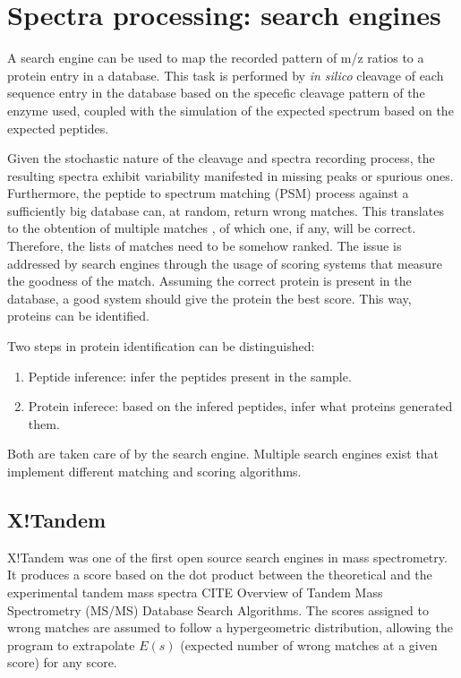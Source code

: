 \documentclass[11pt, a4paper]{report}
\begin{document}
\section{Spectra processing: search engines}
\label{sec:search_engines}

A search engine can be used to map the recorded pattern of m/z ratios to a protein entry in a database. This task is performed by \textit{in silico} cleavage of each sequence entry in the database based on the specefic cleavage pattern of the enzyme used, coupled with the simulation of the expected spectrum based on the expected peptides.

Given the stochastic nature of the cleavage and spectra recording process, the resulting spectra exhibit variability manifested in missing peaks or spurious ones. Furthermore, the peptide to spectrum matching (PSM) process against a sufficiently big database can, at random, return wrong matches. This translates to the obtention of multiple matches , of which one, if any, will be correct. Therefore, the lists of matches need to be somehow ranked. The issue is addressed by search engines through the usage of scoring systems that measure the goodness of the match. Assuming the correct protein is present in the database, a good system should give the protein the best score. This way, proteins can be identified.

Two steps in protein identification can be distinguished:

\begin{enumerate}

\item Peptide inference: infer the peptides present in the sample.
\item Protein inferece: based on the infered peptides, infer what proteins generated them.
\end{enumerate}

Both are taken care of by the search engine. Multiple search engines exist that implement different matching and scoring algorithms.

\subsection{X!Tandem}

X!Tandem was one of the first open source search engines in mass spectrometry. It produces a score based on the dot product between the theoretical and the experimental tandem mass spectra CITE Overview of Tandem Mass Spectrometry (MS/MS) Database Search Algorithms. The scores assigned to wrong matches are assumed to follow a hypergeometric distribution, allowing the program to extrapolate $E(s)$ (expected number of wrong matches at a given score) for any score.
\end{document}
